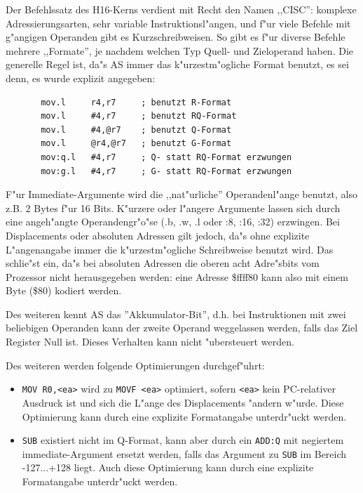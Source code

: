\documentclass[12pt,a4paper,twoside]{report}
\newcommand{\tty}[1]{{\tt #1}}
\newcommand{\asname}{AS}
\begin{document}
Der Befehlssatz des H16-Kerns verdient mit Recht den Namen ,,CISC'': komplexe
Adressierungsarten, sehr variable Instruktionsl"angen, und f"ur viele
Befehle mit g"angigen Operanden gibt es Kurzschreibweisen.  So gibt
es f"ur diverse Befehle mehrere ,,Formate'', je nachdem welchen Typ Quell-
und Zieloperand haben.  Die generelle Regel ist, da"s \asname{} immer
das k"urzestm"ogliche Format benutzt, es sei denn, es wurde explizit
angegeben:
\begin{verbatim}
       mov.l     r4,r7     ; benutzt R-Format
       mov.l     #4,r7     ; benutzt RQ-Format
       mov.l     #4,@r7    ; benutzt Q-Format
       mov.l     @r4,@r7   ; benutzt G-Format
       mov:q.l   #4,r7     ; Q- statt RQ-Format erzwungen 
       mov:g.l   #4,r7     ; G- statt RQ-Format erzwungen 
\end{verbatim}
F"ur Immediate-Argumente wird die ,,nat"urliche'' Operandenl"ange
benutzt, also z.B. 2 Bytes f"ur 16 Bits.  K"urzere oder l"angere
Argumente lassen sich durch eine angeh"angte Operandengr"o"se
(.b, .w, .l oder :8, :16, :32) erzwingen.  Bei Displacements oder
absoluten Adressen gilt jedoch, da"s ohne explizite L"angenangabe
immer die k"urzestm"ogliche Schreibweise benutzt wird.  Das schlie"st
ein, da"s bei absoluten Adressen die oberen acht Adre"sbits vom
Prozessor nicht herausgegeben werden: eine Adresse \$ffff80 kann also
mit einem Byte (\$80) kodiert werden.

Des weiteren kennt \asname{} das ''Akkumulator-Bit'', d.h. bei Instruktionen
mit zwei beliebigen Operanden kann der zweite Operand weggelassen
werden, falls das Ziel Register Null ist.  Dieses Verhalten kann
nicht "ubersteuert werden.

Des weiteren werden folgende Optimierungen durchgef"uhrt:
\begin{itemize}
\item{\tty{MOV R0,<ea>} wird zu \tty{MOVF <ea>} optimiert, sofern
      \tty{<ea>} kein PC-relativer Ausdruck ist und sich die L"ange
      des Displacements "andern w"urde.  Diese Optimierung kann durch
      eine explizite Formatangabe unterdr"uckt werden.}
\item{\tty{SUB} existiert nicht im Q-Format, kann aber durch ein
      \tty{ADD:Q} mit negiertem immediate-Argument ersetzt werden,
      falls das Argument zu \tty{SUB} im Bereich -127...+128 liegt.
      Auch diese Optimierung kann durch eine explizite Formatangabe
      unterdr"uckt werden.}
\end{itemize}

\end{document}
